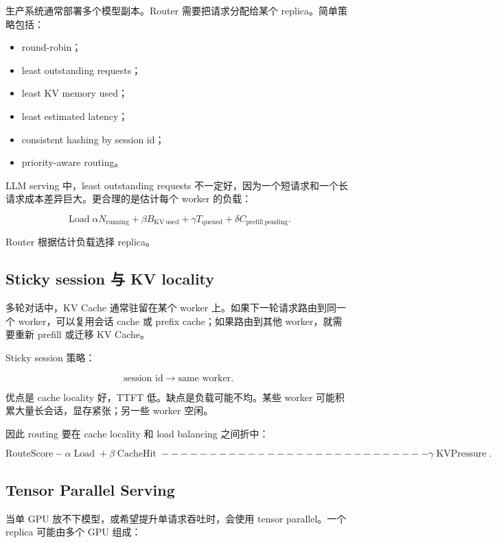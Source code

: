 生产系统通常部署多个模型副本。Router 需要把请求分配给某个 replica。简单策略包括：

\begin{itemize}
\item round-robin；
\item least outstanding requests；
\item least KV memory used；
\item least estimated latency；
\item consistent hashing by session id；
\item priority-aware routing。
\end{itemize}

LLM serving 中，least outstanding requests 不一定好，因为一个短请求和一个长请求成本差异巨大。更合理的是估计每个 worker 的负载：

\[
\operatorname{Load}
\alpha N_{\mathrm{running}}
+
\beta B_{\mathrm{KV\ used}}
+
\gamma T_{\mathrm{queued}}
+
\delta C_{\mathrm{prefill\ pending}}.
\]

Router 根据估计负载选择 replica。

\subsection{Sticky session 与 KV locality}
\label{subsec:sticky-session-and-kv-locality}

多轮对话中，KV Cache 通常驻留在某个 worker 上。如果下一轮请求路由到同一个 worker，可以复用会话 cache 或 prefix cache；如果路由到其他 worker，就需要重新 prefill 或迁移 KV Cache。

Sticky session 策略：

\[
\text{session id}
\rightarrow
\text{same worker}.
\]

优点是 cache locality 好，TTFT 低。缺点是负载可能不均。某些 worker 可能积累大量长会话，显存紧张；另一些 worker 空闲。

因此 routing 要在 cache locality 和 load balancing 之间折中：

\[
\text{RouteScore}
-\alpha\operatorname{Load}
+
\beta\operatorname{CacheHit}
----------------------------
\gamma\operatorname{KVPressure}.
\]

\subsection{Tensor Parallel Serving}
\label{subsec:tensor-parallel-serving-scheduling}

当单 GPU 放不下模型，或希望提升单请求吞吐时，会使用 tensor parallel。一个 replica 可能由多个 GPU 组成：

